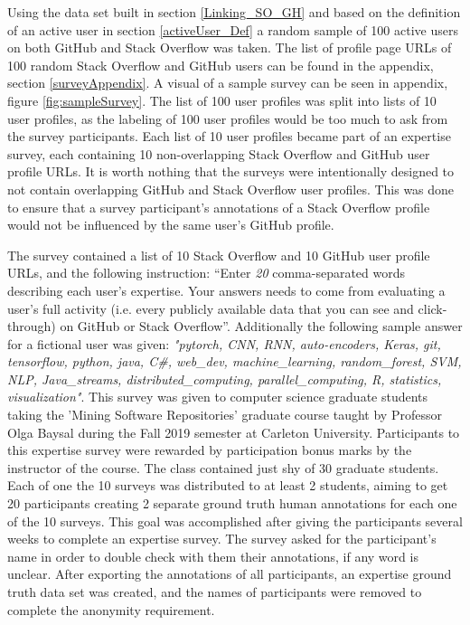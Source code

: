             Using the data set built in section \ref{Linking_SO_GH} and based on the definition of an active user in section \ref{activeUser_Def} a random sample of 100 active users on both GitHub and Stack Overflow was taken. The list of profile page URLs of 100 random Stack Overflow and GitHub users can be found in the appendix, section \ref{surveyAppendix}. A visual of a sample survey can be seen in appendix, figure \ref{fig:sampleSurvey}. The list of 100 user profiles was split into lists of 10 user profiles, as the labeling of 100 user profiles would be too much to ask from the survey participants. Each list of 10 user profiles became part of an expertise survey, each containing 10 non-overlapping Stack Overflow and GitHub user profile URLs. It is worth nothing that the surveys were intentionally designed to not contain overlapping GitHub and Stack Overflow user profiles. This was done to ensure that a survey participant's annotations of a Stack Overflow profile would not be influenced by the same user's GitHub profile.
            
            The survey contained a list of 10 Stack Overflow and 10 GitHub user profile URLs, and the following instruction: ``Enter \emph{20} comma-separated words describing each user's expertise. Your answers needs to come from evaluating a user's full activity (i.e. every publicly available data that you can see and click-through) on GitHub or Stack Overflow''. Additionally the following sample answer for a fictional user was given: \emph{"pytorch, CNN, RNN, auto-encoders, Keras, git, tensorflow, python, java, C\#, web\_dev, machine\_learning, random\_forest, SVM, NLP, Java\_streams, distributed\_computing, parallel\_computing, R, statistics, visualization"}. This survey was given to computer science graduate students taking the 'Mining Software Repositories' graduate course taught by Professor Olga Baysal during the Fall 2019 semester at Carleton University. Participants to this expertise survey were rewarded by participation bonus marks by the instructor of the course. The class contained just shy of 30 graduate students. Each of one the 10 surveys was distributed to at least 2 students, aiming to get 20 participants creating 2 separate ground truth human annotations for each one of the 10 surveys. This goal was accomplished after giving the participants several weeks to complete an expertise survey. The survey asked for the participant's name in order to double check with them their annotations, if any word is unclear. After exporting the annotations of all participants, an expertise ground truth data set was created, and the names of participants were removed to complete the anonymity requirement. 
        
